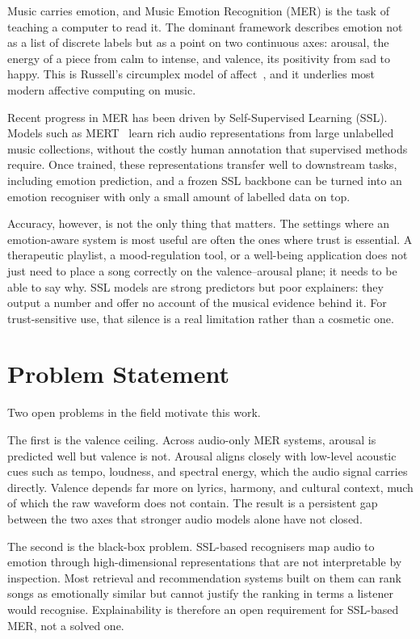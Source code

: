 \documentclass[12pt]{report}
\begin{document}
Music carries emotion, and Music Emotion Recognition (MER) is the task of teaching a computer to read it. The dominant framework describes emotion not as a list of discrete labels but as a point on two continuous axes: arousal, the energy of a piece from calm to intense, and valence, its positivity from sad to happy. This is Russell's circumplex model of affect~\cite{russell_circumplex_1980}, and it underlies most modern affective computing on music.

Recent progress in MER has been driven by Self-Supervised Learning (SSL). Models such as MERT~\cite{li_mert_2024} learn rich audio representations from large unlabelled music collections, without the costly human annotation that supervised methods require. Once trained, these representations transfer well to downstream tasks, including emotion prediction, and a frozen SSL backbone can be turned into an emotion recogniser with only a small amount of labelled data on top.

Accuracy, however, is not the only thing that matters. The settings where an emotion-aware system is most useful are often the ones where trust is essential. A therapeutic playlist, a mood-regulation tool, or a well-being application does not just need to place a song correctly on the valence--arousal plane; it needs to be able to say why. SSL models are strong predictors but poor explainers: they output a number and offer no account of the musical evidence behind it. For trust-sensitive use, that silence is a real limitation rather than a cosmetic one.

\section{Problem Statement}

Two open problems in the field motivate this work.

The first is the valence ceiling. Across audio-only MER systems, arousal is predicted well but valence is not. Arousal aligns closely with low-level acoustic cues such as tempo, loudness, and spectral energy, which the audio signal carries directly. Valence depends far more on lyrics, harmony, and cultural context, much of which the raw waveform does not contain. The result is a persistent gap between the two axes that stronger audio models alone have not closed.

The second is the black-box problem. SSL-based recognisers map audio to emotion through high-dimensional representations that are not interpretable by inspection. Most retrieval and recommendation systems built on them can rank songs as emotionally similar but cannot justify the ranking in terms a listener would recognise. Explainability is therefore an open requirement for SSL-based MER, not a solved one.
\end{document}
